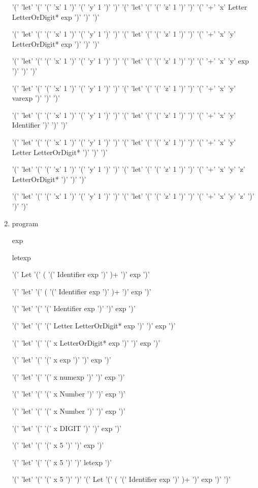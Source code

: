 \documentclass[11pt]{article}
\begin{document}
\begin{enumerate}
	'(' 'let' '(' '(' 'x' 1 ')' '(' 'y' 1 ')' ')' '(' 'let' '(' '(' 'z' 1 ')' ')' '(' '+' 'x' Letter LetterOrDigit* exp ')' ')' ')'

	'(' 'let' '(' '(' 'x' 1 ')' '(' 'y' 1 ')' ')' '(' 'let' '(' '(' 'z' 1 ')' ')' '(' '+' 'x' 'y' LetterOrDigit* exp ')' ')' ')'

	'(' 'let' '(' '(' 'x' 1 ')' '(' 'y' 1 ')' ')' '(' 'let' '(' '(' 'z' 1 ')' ')' '(' '+' 'x' 'y' exp ')' ')' ')'

	'(' 'let' '(' '(' 'x' 1 ')' '(' 'y' 1 ')' ')' '(' 'let' '(' '(' 'z' 1 ')' ')' '(' '+' 'x' 'y' varexp ')' ')' ')'

	'(' 'let' '(' '(' 'x' 1 ')' '(' 'y' 1 ')' ')' '(' 'let' '(' '(' 'z' 1 ')' ')' '(' '+' 'x' 'y' Identifier ')' ')' ')'

	'(' 'let' '(' '(' 'x' 1 ')' '(' 'y' 1 ')' ')' '(' 'let' '(' '(' 'z' 1 ')' ')' '(' '+' 'x' 'y' Letter LetterOrDigit* ')' ')' ')'

	'(' 'let' '(' '(' 'x' 1 ')' '(' 'y' 1 ')' ')' '(' 'let' '(' '(' 'z' 1 ')' ')' '(' '+' 'x' 'y' 'z' LetterOrDigit* ')' ')' ')'

	'(' 'let' '(' '(' 'x' 1 ')' '(' 'y' 1 ')' ')' '(' 'let' '(' '(' 'z' 1 ')' ')' '(' '+' 'x' 'y' 'z' ')' ')' ')'

	\item program

	exp

	letexp

	'(' Let '(' ( '(' Identifier exp ')' )+ ')' exp ')'

	'(' 'let' '(' ( '(' Identifier exp ')' )+ ')' exp ')'

	'(' 'let' '(' '(' Identifier exp ')' ')' exp ')'

	'(' 'let' '(' '(' Letter LetterOrDigit* exp ')' ')' exp ')'

	'(' 'let' '(' '(' x LetterOrDigit* exp ')' ')' exp ')'

	'(' 'let' '(' '(' x exp ')' ')' exp ')'

	'(' 'let' '(' '(' x numexp ')' ')' exp ')'

	'(' 'let' '(' '(' x Number ')' ')' exp ')'

	'(' 'let' '(' '(' x Number ')' ')' exp ')'

	'(' 'let' '(' '(' x DIGIT ')' ')' exp ')'

	'(' 'let' '(' '(' x 5 ')' ')' exp ')'

	'(' 'let' '(' '(' x 5 ')' ')' letexp ')'

	'(' 'let' '(' '(' x 5 ')' ')' '(' Let '(' ( '(' Identifier exp ')' )+ ')' exp ')' ')'


\end{enumerate}
\end{document}

